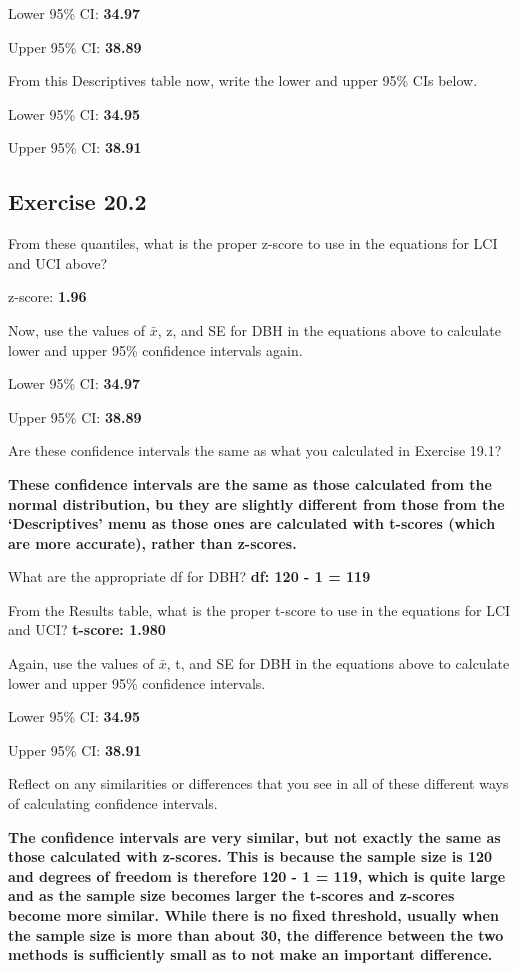 \documentclass[
  openany]{scrbook}
\begin{document}
Lower 95\% CI: \textbf{34.97}

Upper 95\% CI: \textbf{38.89}

From this Descriptives table now, write the lower and upper 95\% CIs below.

Lower 95\% CI: \textbf{34.95}

Upper 95\% CI: \textbf{38.91}

\hypertarget{exercise-20.2}{%
\subsection{Exercise 20.2}\label{exercise-20.2}}

From these quantiles, what is the proper z-score to use in the equations for LCI
and UCI above?

z-score: \textbf{1.96}

Now, use the values of \(\bar{x}\), z, and SE for DBH in the equations above to calculate lower and upper 95\% confidence intervals again.

Lower 95\% CI: \textbf{34.97}

Upper 95\% CI: \textbf{38.89}

Are these confidence intervals the same as what you calculated in Exercise 19.1?

\textbf{These confidence intervals are the same as those calculated from the normal distribution, bu they are slightly different from those from the `Descriptives' menu as those ones are calculated with t-scores (which are more accurate), rather than z-scores.}

What are the appropriate df for DBH? \textbf{df: 120 - 1 = 119}

From the Results table, what is the proper t-score to use in the equations for LCI and UCI? \textbf{t-score: 1.980}

Again, use the values of \(\bar{x}\), t, and SE for DBH in the equations above to calculate lower and upper 95\% confidence intervals.

Lower 95\% CI: \textbf{34.95}

Upper 95\% CI: \textbf{38.91}

Reflect on any similarities or differences that you see in all of these different ways of calculating confidence intervals.

\textbf{The confidence intervals are very similar, but not exactly the same as those calculated with z-scores. This is because the sample size is 120 and degrees of freedom is therefore 120 - 1 = 119, which is quite large and as the sample size becomes larger the t-scores and z-scores become more similar. While there is no fixed threshold, usually when the sample size is more than about 30, the difference between the two methods is sufficiently small as to not make an important difference.}
\end{document}

